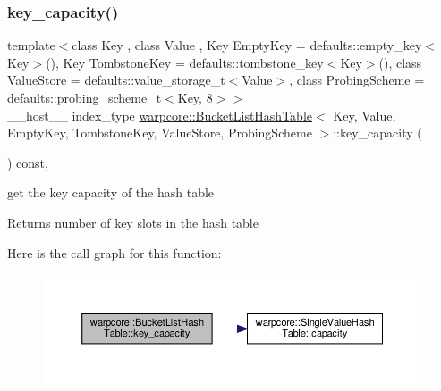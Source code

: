 \subsubsection{\texorpdfstring{key\+\_\+capacity()}{key\_capacity()}}
{\footnotesize\ttfamily template$<$class Key , class Value , Key Empty\+Key = defaults\+::empty\+\_\+key$<$\+Key$>$(), Key Tombstone\+Key = defaults\+::tombstone\+\_\+key$<$\+Key$>$(), class Value\+Store  = defaults\+::value\+\_\+storage\+\_\+t$<$\+Value$>$, class Probing\+Scheme  = defaults\+::probing\+\_\+scheme\+\_\+t$<$\+Key, 8$>$$>$ \\
\+\_\+\+\_\+host\+\_\+\+\_\+ index\+\_\+type \hyperlink{classwarpcore_1_1BucketListHashTable}{warpcore\+::\+Bucket\+List\+Hash\+Table}$<$ Key, Value, Empty\+Key, Tombstone\+Key, Value\+Store, Probing\+Scheme $>$\+::key\+\_\+capacity (\begin{DoxyParamCaption}{ }\end{DoxyParamCaption}) const\hspace{0.3cm}{\ttfamily [inline]}, {\ttfamily [noexcept]}}



get the key capacity of the hash table 

\begin{DoxyReturn}{Returns}
number of key slots in the hash table 
\end{DoxyReturn}
Here is the call graph for this function\+:
\nopagebreak
\begin{figure}[H]
\begin{center}
\leavevmode
\includegraphics[width=350pt]{classwarpcore_1_1BucketListHashTable_a7902d5c984290d262f5964f55a666765_cgraph}
\end{center}
\end{figure}
\mbox{\label{classwarpcore_1_1BucketListHashTable_ac0a51f17e2c2deaee7ad80e491b96259}} 
